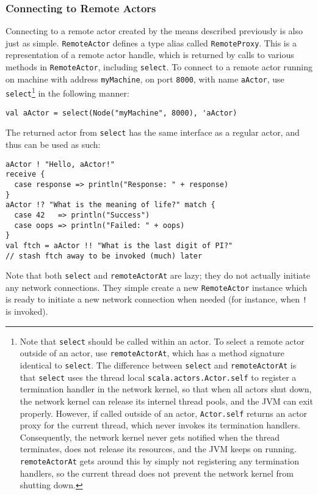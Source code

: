 \documentclass{article}
\begin{document}
\subsubsection{Connecting to Remote Actors}
Connecting to a remote actor created by the means described previously is also
just as simple. \verb|RemoteActor| defines a type alias called \verb|RemoteProxy|. 
This is a representation of a remote actor handle, which is returned by calls to
various methods in \verb|RemoteActor|, including \verb|select|. To connect
to a remote actor running on machine with address \verb|myMachine|, on port \verb|8000|,
with name \verb|aActor|, use \verb|select|\footnote{
  Note that \texttt{select} should be called within an actor. To select a remote actor
  outside of an actor, use \texttt{remoteActorAt}, which has a method signature
  identical to \texttt{select}. The difference between \texttt{select} and \texttt{remoteActorAt}
  is that \texttt{select} uses the thread local \texttt{scala.actors.Actor.self} to 
  register a termination handler in the network kernel, so that when all actors shut down,
  the network kernel can release its internel thread pools, and the JVM can exit properly.
  However, if called outside of an actor, \texttt{Actor.self} returns an actor proxy for the
  current thread, which never invokes its termination handlers. Consequently, the network
  kernel never gets notified when the thread terminates, does not release its resources, and
  the JVM keeps on running. \texttt{remoteActorAt} gets around this by simply not registering
  any termination handlers, so the current thread does not prevent the network kernel
  from shutting down.
}
in the following manner:
\begin{verbatim}
val aActor = select(Node("myMachine", 8000), 'aActor)
\end{verbatim}
The returned actor from \verb|select| has the same interface as a regular actor, and thus
can be used as such:
\begin{verbatim}
aActor ! "Hello, aActor!"
receive {
  case response => println("Response: " + response)
}
aActor !? "What is the meaning of life?" match {
  case 42   => println("Success")
  case oops => println("Failed: " + oops)
}
val ftch = aActor !! "What is the last digit of PI?"
// stash ftch away to be invoked (much) later
\end{verbatim}
Note that both \verb|select| and \verb|remoteActorAt| are lazy; they do not actually initiate any
network connections. They simple create a new \verb|RemoteActor| instance which is ready
to initiate a new network connection when needed (for instance, when \verb|!| is invoked). 
\end{document}
